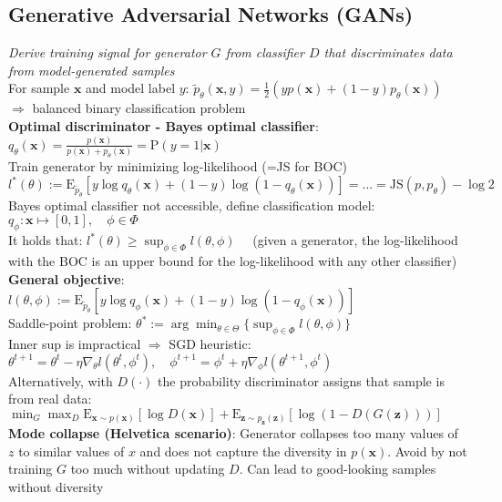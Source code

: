 \subsection*{Generative Adversarial Networks (GANs)}
\textit{Derive training signal for generator $G$ from classifier $D$ that discriminates data from model-generated samples}\\
For sample $\mathbf x$ and model label $y$: $\tilde p_\theta(\mathbf x, y)=\frac{1}{2}(yp(\mathbf x)+(1-y)p_\theta(\mathbf x))$\\
$\Rightarrow$ balanced binary classification problem\\
\textbf{Optimal discriminator - Bayes optimal classifier}: \\$q_\theta(\mathbf x)=\frac{p(\mathbf x)}{p(\mathbf x)+p_\theta(\mathbf x)}=\mathrm P(y=1|\mathbf x)$\\
Train generator by minimizing log-likelihood (=JS for BOC)\\ $l^*(\theta):=\mathrm E_{\tilde p_\theta}[y\log q_\theta(\mathbf x)+(1-y)\log(1-q_\theta(\mathbf x))]=...=\text{JS}(p,p_\theta)-\log 2$\\
Bayes optimal classifier not accessible, define classification model: $q_\phi: \mathbf x\mapsto [0,1], \quad \phi\in\Phi$\\
It holds that: $l^*(\theta)\geq\sup_{\phi\in\Phi}l(\theta,\phi)\quad$ (given a generator, the log-likelihood with the BOC is an upper bound for the log-likelihood with any other classifier)\\
\textbf{General objective}: $l(\theta,\phi):=\mathrm E_{\tilde p_\theta}[y\log q_\phi(\mathbf x)+(1-y)\log(1-q_\phi(\mathbf x))]$\\
Saddle-point problem: $\theta^*:=\arg\min_{\theta\in\Theta}\{\sup_{\phi\in\Phi}l(\theta,\phi)\}$\\
Inner sup is impractical $\Rightarrow$ SGD heuristic: \\
$\theta^{t+1}=\theta^t-\eta\nabla_\theta l(\theta^t,\phi^t), \quad \phi^{t+1}=\phi^t+\eta\nabla_\phi l(\theta^{t+1},\phi^t)$\\
Alternatively, with $D(\cdot)$ the probability discriminator assigns that sample is from real data:\\ $\min_G\max_D\mathrm E_{\mathbf x\sim p(\mathbf x)}[\log D(\mathbf x)]+\mathrm E_{\mathbf z\sim p_\mathbf z(\mathbf z)}[\log(1-D(G(\mathbf z)))]$\\
\textbf{Mode collapse (Helvetica scenario)}: Generator collapses too many values of $z$ to similar values of $x$ and does not capture the diversity in $p(\mathbf x)$. Avoid by not training $G$ too much without updating $D$. Can lead to good-looking samples without diversity\\
